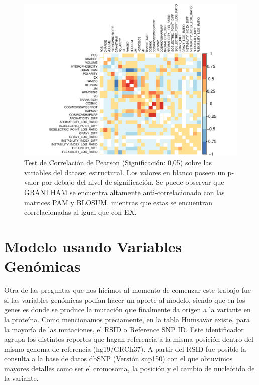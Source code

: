 \begin{figure}[H]
    \centering
    \includegraphics[scale=0.8]{documents/latex/figures/3/corrplot_1.pdf}
    \caption{Test de Correlación de Pearson (Significación: 0,05) sobre las variables del dataset estructural. Los valores en blanco poseen un p-valor por debajo del nivel de significación. Se puede observar que GRANTHAM se encuentra altamente anti-correlacionado con las matrices PAM y BLOSUM, mientras que estas se encuentran correlacionadas al igual que con EX.}
    \label{fig:corrplot_1}
\end{figure}




\section{Modelo usando Variables Genómicas}

Otra de las preguntas que nos hicimos al momento de comenzar este trabajo fue si las variables genómicas podían hacer un aporte al modelo, siendo que en los genes es donde se produce la mutación que finalmente da origen a la variante en la proteína. Como mencionamos preciamente, en la tabla Humsavar existe, para la mayoría de las mutaciones, el RSID o Reference SNP ID. Este identificador agrupa los distintos reportes que hagan referencia a la misma posición dentro del mismo genoma de referencia (hg19/GRCh37). A partir del RSID fue posible la consulta a la base de datos dbSNP (Versión snp150) con el que obtuvimos mayores detalles como ser el cromosoma, la posición y el cambio de nucleótido de la variante. 

